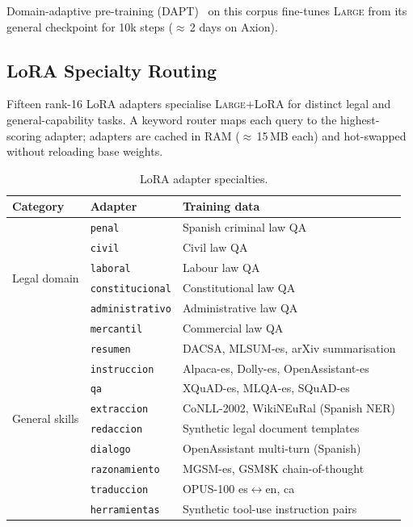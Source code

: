 \documentclass[11pt,a4paper]{article}
\begin{document}
Domain-adaptive pre-training (DAPT)~\citep{gururangan2020dont} on this corpus
fine-tunes \textsc{Large} from its general checkpoint for 10k steps
($\approx$\,2 days on Axion).

\subsection{LoRA Specialty Routing}

Fifteen rank-16 LoRA adapters specialise \textsc{Large}$+$LoRA for distinct
legal and general-capability tasks. A keyword router maps each query to the
highest-scoring adapter; adapters are cached in RAM ($\approx$\,15\,MB each)
and hot-swapped without reloading base weights.

\begin{table}[h]
\centering
\caption{LoRA adapter specialties.}
\label{tab:lora}
\begin{tabular}{ll p{6cm}}
\toprule
Category & Adapter & Training data \\
\midrule
\multirow{6}{*}{Legal domain}
  & \texttt{penal}          & Spanish criminal law QA \\
  & \texttt{civil}          & Civil law QA \\
  & \texttt{laboral}        & Labour law QA \\
  & \texttt{constitucional} & Constitutional law QA \\
  & \texttt{administrativo} & Administrative law QA \\
  & \texttt{mercantil}      & Commercial law QA \\
\midrule
\multirow{8}{*}{General skills}
  & \texttt{resumen}        & DACSA, MLSUM-es, arXiv summarisation \\
  & \texttt{instruccion}    & Alpaca-es, Dolly-es, OpenAssistant-es \\
  & \texttt{qa}             & XQuAD-es, MLQA-es, SQuAD-es \\
  & \texttt{extraccion}     & CoNLL-2002, WikiNEuRal (Spanish NER) \\
  & \texttt{redaccion}      & Synthetic legal document templates \\
  & \texttt{dialogo}        & OpenAssistant multi-turn (Spanish) \\
  & \texttt{razonamiento}   & MGSM-es, GSM8K chain-of-thought \\
  & \texttt{traduccion}     & OPUS-100 es$\leftrightarrow$en, ca \\
  & \texttt{herramientas}   & Synthetic tool-use instruction pairs \\
\bottomrule
\end{tabular}
\end{table}
\end{document}
